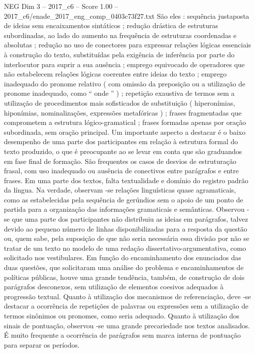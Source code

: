 \begin{textsample}{NEG Dim 3 – 2017\_c6 – Score 1.00 – 2017\_c6/enade\_2017\_eng\_comp\_0403c73f27.txt}
São eles : sequência justaposta de ideias sem encaixamentos sintáticos ; redução drástica de estruturas subordinadas, ao lado do aumento na frequência de estruturas coordenadas e absolutas ; redução no uso de conectores para expressar relações lógicas essenciais à construção do texto, substituídas pela exigência de inferência por parte do interlocutor para suprir a sua ausência ; emprego equivocado de operadores que não estabelecem relações lógicas coerentes entre ideias do texto ; emprego inadequado do pronome relativo ( com omissão da preposição ou a utilização de pronome inadequado, como “ onde ” ) ; repetição exaustiva de termos sem a utilização de procedimentos mais sofisticados de substituição ( hiperonímias, hiponímias, nominalizações, expressões metafóricas ) ; frases fragmentadas que comprometem a estrutura lógico-gramatical ; frases formadas apenas por oração subordinada, sem oração principal.
Um importante aspecto a destacar é o baixo desempenho de uma parte dos participantes em relação à estrutura formal do texto produzido, o que é preocupante ao se levar em conta que são graduandos em fase final de formação.
São frequentes os casos de desvios de estruturação frasal, com uso inadequado ou ausência de conectivos entre parágrafos e entre frases.
Em uma parte dos textos, falta textualidade e domínio do registro padrão da língua.
Na verdade, observam -se relações linguísticas quase agramaticais, como as estabelecidas pela sequência de gerúndios sem o apoio de um ponto de partida para a organização das informações gramaticais e semânticas.
Observou -se que uma parte dos participantes não distribuiu as ideias em parágrafos, talvez devido ao pequeno número de linhas disponibilizadas para a resposta da questão ou, quem sabe, pela suposição de que não seria necessária essa divisão por não se tratar de um texto no modelo de uma redação dissertativo-argumentativa, como solicitado nos vestibulares.
Em função do encaminhamento dos enunciados das duas questões, que solicitaram uma análise do problema e encaminhamentos de políticas públicas, houve uma grande tendência, também, de construção de dois parágrafos desconexos, sem utilização de elementos coesivos adequados à progressão textual.
Quanto à utilização dos mecanismos de referenciação, deve -se destacar a ocorrência de repetições de palavras ou expressões sem a utilização de termos sinônimos ou pronomes, como seria adequado.
Quanto à utilização dos sinais de pontuação, observou -se uma grande precariedade nos textos analisados.
É muito frequente a ocorrência de parágrafos sem marca interna de pontuação para separar os períodos.

\end{textsample}
